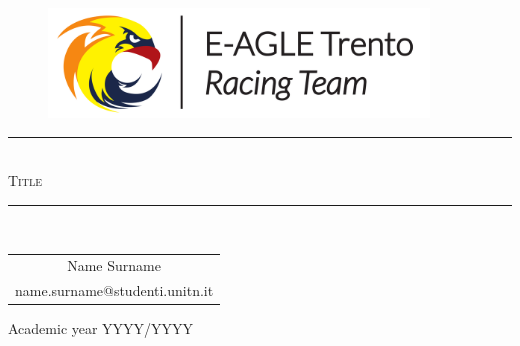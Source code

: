 \pagestyle{plain}

\thispagestyle{empty}

\begin{center}
  \begin{figure}[h!]
    \centerline{\includegraphics[width=0.9\textwidth]{images/Logo_Anteriore.pdf}}
  \end{figure}
    
    \vspace{0.7 cm} 
    
    \rule{\linewidth}{0.2 mm} \\[1 cm]
  
  \Huge\textsc{Title}
  
  \vspace{0.7 cm} 
  \rule{\linewidth}{0.2 mm} \\[1 cm]
  \vspace{2 cm}
    \begin{center}
        \begin{tabular}{c}
            Name Surname\\
            name.surname@studenti.unitn.it
        \end{tabular}
    \end{center}

  \vspace{4 cm} 

  \Large{Academic year YYYY/YYYY}
  \\[1cm]
  
\end{center}

